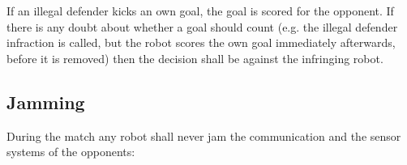 \documentclass[12pt]{article}
\newcommand{\cf}{\mbox{cf.}\xspace}
\begin{document}
If an illegal defender kicks an own goal, the goal is scored for the opponent. If there is any doubt about whether a goal should count (e.g. the illegal defender infraction is called, but the robot scores the own goal immediately afterwards, before it is removed) then the decision shall be against the infringing robot.

%
%
%
%

\subsection{Jamming}

During the match any robot shall never jam the communication and the sensor systems of the opponents:
\end{document}
